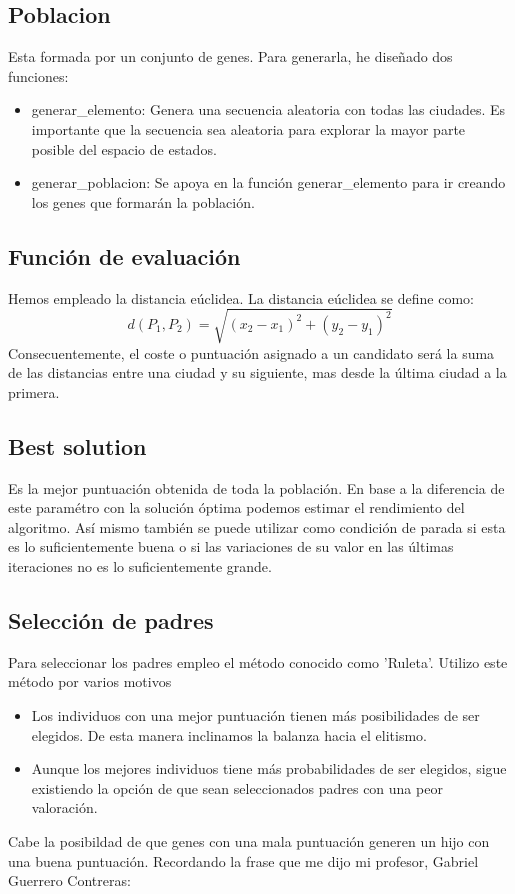 \documentclass{article}
\begin{document}
\subsection{Poblacion}
    Esta formada por un conjunto de genes. Para generarla, he diseñado dos funciones:
    \begin{itemize}
        \item generar\_elemento: Genera una secuencia aleatoria con todas las ciudades. Es importante que la secuencia sea 
        aleatoria para explorar la mayor parte posible del espacio de estados. 
        \item generar\_poblacion: Se apoya en la función generar\_elemento para ir creando los genes que formarán la población. 
    \end{itemize}

\subsection{Función de evaluación}
    Hemos empleado la distancia eúclidea. La distancia eúclidea se define como: 
        \[d(P_1,P_2)= \sqrt{ (x_2 - x_1)^2 +(y_2-y_1)^2} \]
    Consecuentemente, el coste o puntuación asignado a un candidato será la suma de las 
    distancias entre una ciudad y su siguiente, mas desde la última ciudad a la primera.  

\subsection{Best solution}
    Es la mejor puntuación obtenida de toda la población. En base a la diferencia de este paramétro con la solución óptima 
    podemos estimar el rendimiento del algoritmo. Así mismo también se puede utilizar como condición de parada si esta es 
    lo suficientemente buena o si las variaciones de su valor en las últimas iteraciones no es lo suficientemente grande. 
    
\subsection{Selección de padres}
    Para seleccionar los padres empleo el método conocido como 'Ruleta'. Utilizo este método por varios motivos 
    \begin{itemize}
        \item Los individuos con una mejor puntuación tienen más posibilidades de ser elegidos. De esta manera inclinamos 
        la balanza hacia el elitismo. 
        \item Aunque los mejores individuos tiene más probabilidades de ser elegidos, sigue existiendo la opción de que sean 
        seleccionados padres con una peor valoración. 
    \end{itemize}  
    Cabe la posibildad de que genes con una mala puntuación generen un hijo con una buena puntuación. Recordando la frase 
    que me dijo mi profesor, Gabriel Guerrero Contreras: \\
        
\end{document}
